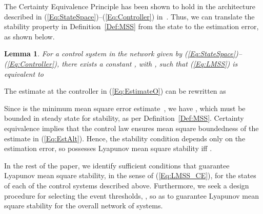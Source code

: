 \documentclass[twocolumn]{autart}
\newtheorem{lemma}[theorem]{Lemma}
\newenvironment{proof}[1][Proof]{\begin{trivlist}
\item[\hskip \labelsep {\bfseries #1}]}{\end{trivlist}}
\renewcommand{\qed}{}
\begin{document}
The Certainty Equivalence Principle has been shown to hold in the architecture described in (\ref{Eq:StateSpace})--(\ref{Eq:Controller}) in~\cite{Ramesh2013}. Thus, we can translate the stability property in Definition~\ref{Def:MSS} from the state to the estimation error, as shown below.
\begin{lemma} \label{Lemma:Lyapunov mean square stability_CE}
For a control system in the network given by (\ref{Eq:StateSpace})--(\ref{Eq:Controller}), there exists a constant , with , such that (\ref{Eq:LMSS}) is equivalent to

\end{lemma}
\begin{proof}
The estimate at the controller in (\ref{Eq:EstimateO}) can be rewritten as

Since  is the minimum mean square error estimate~\cite{Ramesh2013}, we have , which must be bounded in steady state for stability, as per Definition~\ref{Def:MSS}. Certainty equivalence implies that the control law ensures mean square boundedness of the estimate  in (\ref{Eq:EstAlt}). Hence, the stability condition depends only on the estimation error, so  possesses Lyapunov mean square stability iff . \hfill \qed
\end{proof}
In the rest of the paper, we identify sufficient conditions that guarantee Lyapunov mean square stability, in the sense of (\ref{Eq:LMSS_CE}), for the states of each of the  control systems described above. Furthermore, we seek a design procedure for selecting the event thresholds, , so as to guarantee Lyapunov mean square stability for the overall network of systems.
\end{document}
